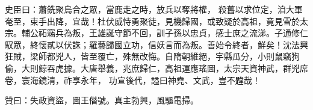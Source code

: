 \begin{pinyinscope}
 史臣曰：蕭銑聚烏合之眾，當鹿走之時，放兵以奪將權，
 殺舊以求位定，洎大軍奄至，束手出降，宜哉！杜伏威恃勇聚徒，見機歸國，或致疑於高祖，竟見雪於太宗。輔公祏竊兵為叛，王雄誕守節不回，訓子孫以忠貞，感士庶之流涕。子通修仁馭眾，終懷貳以伏誅；羅藝歸國立功，信妖言而為叛。善始令終者，鮮矣！沈法興狂賊，梁師都兇人，皆至覆亡，殊無改悔。自隋朝維絕，宇縣瓜分，小則鼠竊狗偷，大則鯨吞虎據。大唐舉義，兆庶歸仁，高祖運應瑤圖，太宗天資神武，群兇席卷，寰海鏡清，祚享永年，
 功宣後代，謚曰神堯、文武，豈不韙哉！



 贊曰：失政資盜，圖王僭號。真主勃興，風驅電掃。



\end{pinyinscope}